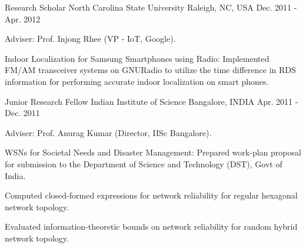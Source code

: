 \begin{cventries}
  \cventry
    {Research Scholar} %
    {North Carolina State University} %
    {Raleigh, NC, USA} %
    {Dec. 2011 - Apr. 2012} %
    {
      \begin{cvitems} %
      \item {Adviser: Prof. Injong Rhee (VP - IoT, Google).}
%      
      \item {Indoor Localization for Samsung Smartphones using Radio: Implemented FM/AM transceiver systems on GNURadio to utilize the time difference in RDS information for performing accurate indoor localization on smart phones.}
%      
      \end{cvitems}
    }
    
  \cventry
    {Junior Research Fellow} %
    {Indian Institute of Science} %
    {Bangalore, INDIA} %
    {Apr. 2011 - Dec. 2011} %
    {
      \begin{cvitems} %
      \item {Adviser: Prof. Anurag Kumar (Director, IISc Bangalore).}
%      
      \item {WSNs for Societal Needs and Disaster Management: Prepared work-plan proposal for submission to the Department of Science and Technology (DST), Govt of India.}
      \item {Computed closed-formed expressions for network reliability for regular hexagonal network topology.}
      \item {Evaluated information-theoretic bounds on network reliability for random hybrid network topology.}
%      
      \end{cvitems}
    }


\end{cventries}
